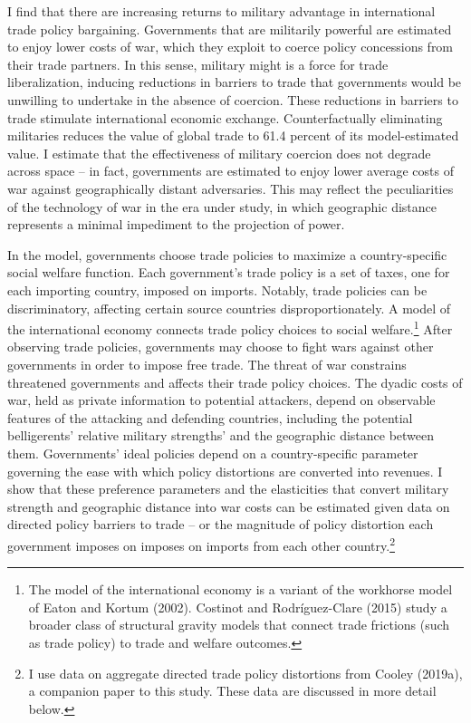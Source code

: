 \documentclass{puthesis}
\begin{document}
I find that there are increasing returns to military advantage in
international trade policy bargaining. Governments that are militarily
powerful are estimated to enjoy lower costs of war, which they exploit
to coerce policy concessions from their trade partners. In this sense,
military might is a force for trade liberalization, inducing reductions
in barriers to trade that governments would be unwilling to undertake in
the absence of coercion. These reductions in barriers to trade stimulate
international economic exchange. Counterfactually eliminating militaries
reduces the value of global trade to 61.4 percent of its model-estimated
value. I estimate that the effectiveness of military coercion does not
degrade across space -- in fact, governments are estimated to enjoy
lower average costs of war against geographically distant adversaries.
This may reflect the peculiarities of the technology of war in the era
under study, in which geographic distance represents a minimal
impediment to the projection of power.

In the model, governments choose trade policies to maximize a
country-specific social welfare function. Each government's trade policy
is a set of taxes, one for each importing country, imposed on imports.
Notably, trade policies can be discriminatory, affecting certain source
countries disproportionately. A model of the international economy
connects trade policy choices to social welfare.\footnote{The model of
  the international economy is a variant of the workhorse model of Eaton
  and Kortum (2002). Costinot and Rodríguez-Clare (2015) study a broader
  class of structural gravity models that connect trade frictions (such
  as trade policy) to trade and welfare outcomes.} After observing trade
policies, governments may choose to fight wars against other governments
in order to impose free trade. The threat of war constrains threatened
governments and affects their trade policy choices. The dyadic costs of
war, held as private information to potential attackers, depend on
observable features of the attacking and defending countries, including
the potential belligerents' relative military strengths' and the
geographic distance between them. Governments' ideal policies depend on
a country-specific parameter governing the ease with which policy
distortions are converted into revenues. I show that these preference
parameters and the elasticities that convert military strength and
geographic distance into war costs can be estimated given data on
directed policy barriers to trade -- or the magnitude of policy
distortion each government imposes on imposes on imports from each other
country.\footnote{I use data on aggregate directed trade policy
  distortions from Cooley (2019a), a companion paper to this study.
  These data are discussed in more detail below.}
\end{document}
